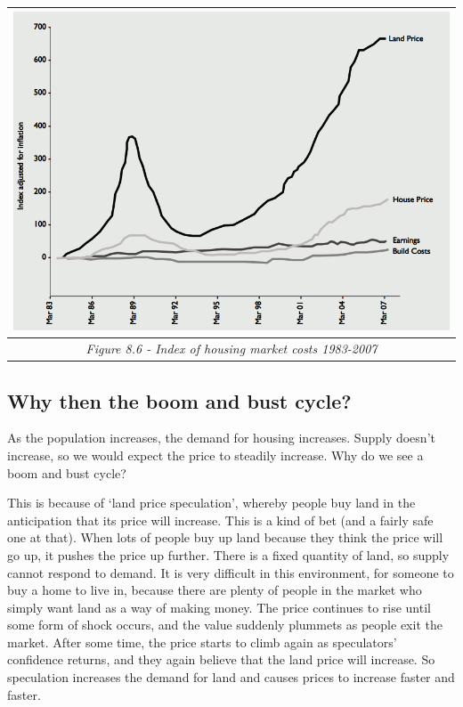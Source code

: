\documentclass[]{tufte-handout}
\begin{document}
\begin{longtable}[]{@{}c@{}}
\toprule
\includegraphics{ChapterPictures/8-6-Indexofhousingmarketcosts1983-2007.png}\tabularnewline
\midrule
\endhead
\emph{Figure 8.6 - Index of housing market costs
1983-2007}\tabularnewline
\bottomrule
\end{longtable}

\hypertarget{why-then-the-boom-and-bust-cycle}{%
\subsection{Why then the boom and bust
cycle?}\label{why-then-the-boom-and-bust-cycle}}

As the population increases, the demand for housing increases. Supply
doesn't increase, so we would expect the price to steadily increase. Why
do we see a boom and bust cycle?

This is because of `land price speculation', whereby people buy land in
the anticipation that its price will increase. This is a kind of bet
(and a fairly safe one at that). When lots of people buy up land because
they think the price will go up, it pushes the price up further. There
is a fixed quantity of land, so supply cannot respond to demand. It is
very difficult in this environment, for someone to buy a home to live
in, because there are plenty of people in the market who simply want
land as a way of making money. The price continues to rise until some
form of shock occurs, and the value suddenly plummets as people exit the
market. After some time, the price starts to climb again as speculators'
confidence returns, and they again believe that the land price will
increase. So speculation increases the demand for land and causes prices
to increase faster and faster.
\end{document}
